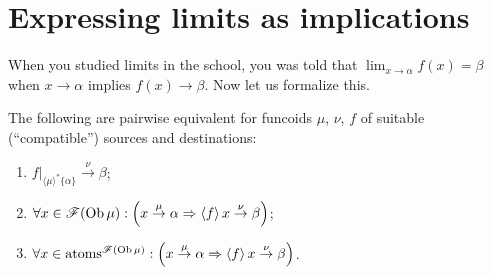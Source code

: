 \section{Expressing limits as implications}

When you studied limits in the school, you was told that
$\lim_{x\to\alpha} f(x) = \beta$ when $x\to\alpha$ implies
$f(x) \to \beta$. Now let us formalize this.

\begin{prop}
  The following are pairwise equivalent for funcoids $\mu$, $\nu$, $f$ of
  suitable (``compatible'') sources and destinations:
  \begin{enumerate}
    \item\label{implim-one} $f|_{\langle \mu \rangle^{\ast} \{ \alpha \}}
    \overset{\nu}{\rightarrow} \beta$;
    
    \item\label{implim-f} $\forall x \in \mathscr{F} (\operatorname{Ob} \mu) : \left( x
    \overset{\mu}{\rightarrow} \alpha \Rightarrow \left\langle f\right\rangle x
    \overset{\nu}{\rightarrow} \beta \right)$;
    
    \item\label{implim-a} $\forall x \in \operatorname{atoms}^{\mathscr{F} (\operatorname{Ob} \mu)} : \left( x
    \overset{\mu}{\rightarrow} \alpha \Rightarrow \left\langle f\right\rangle x
    \overset{\nu}{\rightarrow} \beta \right)$.
  \end{enumerate}
\end{prop}

